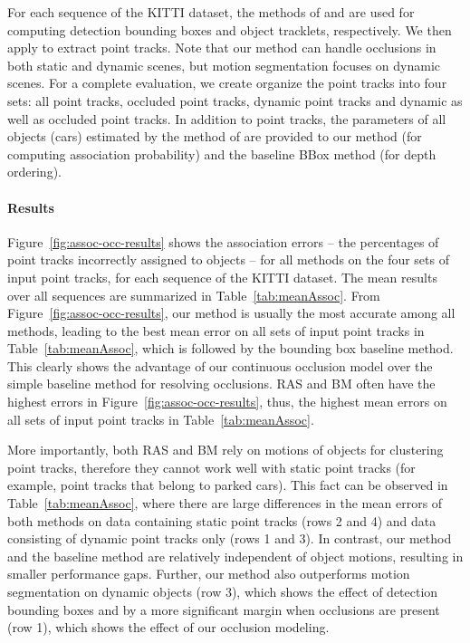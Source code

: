 
For each sequence of the KITTI dataset, the methods of \cite{Felzenszwalb_etal_2010} and \cite{Choi_Savarese_2010} are used for computing detection bounding boxes and object tracklets, respectively. We then apply \cite{Zach2007} to extract point tracks. Note that our method can handle occlusions in both static and dynamic scenes, but motion segmentation focuses on dynamic scenes. For a complete evaluation, we create organize the point tracks into four sets: all point tracks, occluded point tracks, dynamic point tracks and dynamic as well as occluded point tracks. In addition to point tracks, the parameters of all objects (cars) estimated by the method of \cite{Song_Chandraker_2015} are provided to our method (for computing association probability) and the baseline BBox method (for depth ordering).


\vspace{-0.4cm}
\paragraph{Results}
Figure~\ref{fig:assoc-occ-results} shows the association errors -- the percentages of point tracks incorrectly assigned to objects -- for all methods on the four sets of input point tracks, for each sequence of the KITTI dataset. The mean results over all sequences are summarized in Table~\ref{tab:meanAssoc}. From Figure~\ref{fig:assoc-occ-results}, our method is usually the most accurate among all methods, leading to the best mean error on all sets of input point tracks in Table~\ref{tab:meanAssoc}, which is followed by the bounding box baseline method. This clearly shows the advantage of our continuous occlusion model over the simple baseline method for resolving occlusions. RAS and BM often have the highest errors in Figure~\ref{fig:assoc-occ-results}, thus, the highest mean errors on all sets of input point tracks in Table~\ref{tab:meanAssoc}. 

More importantly, both RAS and BM rely on motions of objects for clustering point tracks, therefore they cannot work well with static point tracks (for example, point tracks that belong to parked cars). This fact can be observed in Table~\ref{tab:meanAssoc}, where there are large differences in the mean errors of both methods on data containing static point tracks (rows 2 and 4) and data consisting of dynamic point tracks only (rows 1 and 3). In contrast, our method and the baseline method are relatively independent of object motions, resulting in smaller performance gaps. Further, our method also outperforms motion segmentation on dynamic objects (row 3), which shows the effect of detection bounding boxes and by a more significant margin when occlusions are present (row 1), which shows the effect of our occlusion modeling.

